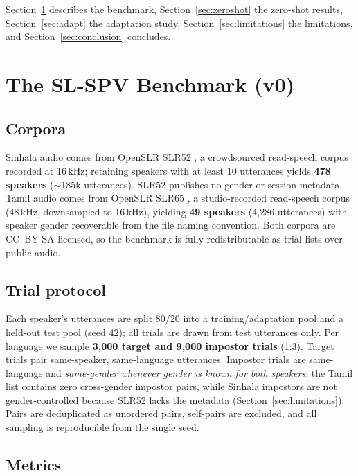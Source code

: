 \documentclass[journal]{IEEEtran}
\begin{document}
Section~\ref{sec:benchmark} describes the benchmark,
Section~\ref{sec:zeroshot} the zero-shot results,
Section~\ref{sec:adapt} the adaptation study,
Section~\ref{sec:limitations} the limitations, and
Section~\ref{sec:conclusion} concludes.

\section{The SL-SPV Benchmark (v0)}
\label{sec:benchmark}

\subsection{Corpora}
\label{ssec:corpora}

Sinhala audio comes from OpenSLR SLR52
\cite{kjartansson2018crowdsourced}, a crowdsourced read-speech corpus
recorded at 16\,kHz; retaining speakers with at least 10 utterances
yields \textbf{478 speakers} ($\sim$185k utterances). SLR52 publishes
no gender or session metadata. Tamil audio comes from OpenSLR SLR65
\cite{he2020opensource}, a studio-recorded read-speech corpus
(48\,kHz, downsampled to 16\,kHz), yielding \textbf{49 speakers}
(4{,}286 utterances) with speaker gender recoverable from the file
naming convention. Both corpora are CC~BY-SA licensed, so the
benchmark is fully redistributable as trial lists over public audio.

\subsection{Trial protocol}
\label{ssec:protocol}

Each speaker's utterances are split 80/20 into a training/adaptation
pool and a held-out test pool (seed 42); all trials are drawn from
test utterances only. Per language we sample \textbf{3{,}000 target
and 9{,}000 impostor trials} (1:3). Target trials pair same-speaker,
same-language utterances. Impostor trials are same-language and
\emph{same-gender whenever gender is known for both speakers}: the
Tamil list contains zero cross-gender impostor pairs, while Sinhala
impostors are not gender-controlled because SLR52 lacks the metadata
(Section~\ref{sec:limitations}). Pairs are deduplicated as unordered
pairs, self-pairs are excluded, and all sampling is reproducible from
the single seed.

\subsection{Metrics}
\label{ssec:metrics}
\end{document}
